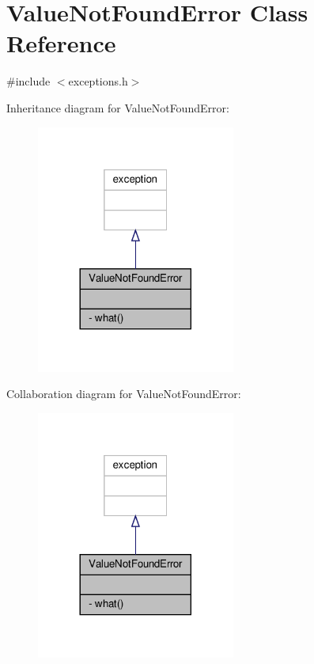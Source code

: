 \hypertarget{classValueNotFoundError}{}\section{Value\+Not\+Found\+Error Class Reference}
\label{classValueNotFoundError}


{\ttfamily \#include $<$exceptions.\+h$>$}



Inheritance diagram for Value\+Not\+Found\+Error\+:\nopagebreak
\begin{figure}[H]
\begin{center}
\leavevmode
\includegraphics[width=185pt]{classValueNotFoundError__inherit__graph}
\end{center}
\end{figure}


Collaboration diagram for Value\+Not\+Found\+Error\+:\nopagebreak
\begin{figure}[H]
\begin{center}
\leavevmode
\includegraphics[width=185pt]{classValueNotFoundError__coll__graph}
\end{center}
\end{figure}
